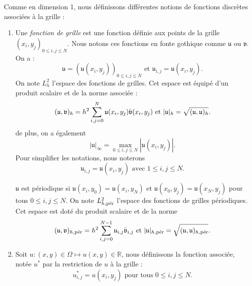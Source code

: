 Comme en dimension 1, nous définissons différentes notions de fonctions discrètes associées à la grille :
\begin{enumerate}
\item Une \textit{fonction de grille} est une fonction définie aux points de la grille $(x_i,y_j)_{0 \leq i,j \leq N}$. Nous notons ces fonctions en fonte gothique comme $\mathfrak{u}$ ou $\mathfrak{v}$. On a :
\begin{equation}
\mathfrak{u} = \left( \mathfrak{u}(x_i,y_j) \right)_{0 \leq i,j \leq N} \text{ et } \mathfrak{u}_{i,j} = \mathfrak{u}(x_i,y_j).
\end{equation}
On note $L^2_h$ l'espace des fonctions de grilles. Cet espace est équipé d'un produit scalaire et de la norme associée :
\begin{equation}
(\mathfrak{u}, \mathfrak{v})_h = h^2 \gsum_{i,j=0}^N \mathfrak{u}(x_i, y_j) \bar{\mathfrak{v}}(x_i, y_j) \text{ et } |\mathfrak{u}|_h = \sqrt{(\mathfrak{u},\mathfrak{u})_h}.
\end{equation}
de plus, on a également
\begin{equation}
| \mathfrak{u} |_{\infty} = \max_{0 \leq i,j \leq N} |\mathfrak{u}(x_i, y_j)|.
\end{equation}
Pour simplifier les notations, nous noterons
\begin{equation}
\mathfrak{u}_{i,j} = \mathfrak{u}(x_i, y_j) \text{ avec } 1 \leq i,j \leq N.
\end{equation}

$\mathfrak{u}$ est périodique si $\mathfrak{u}(x_{i},y_0) = \mathfrak{u}(x_{i},y_N)$ et $\mathfrak{u}(x_{0},y_j) = \mathfrak{u}(x_{N},y_j)$ pour tous $0 \leq i,j \leq N$. On note $L_{h,\per}^2$ l'espace des fonctions de grilles périodiques. Cet espace est doté du produit scalaire et de la norme
\begin{equation}
(\mathfrak{u},\mathfrak{v})_{h,\per} = h^2 \sum_{i,j=0}^{N-1} \mathfrak{u}_{i,j} \bar{\mathfrak{v}}_{i,j} \text{ et } |\mathfrak{u}|_{h,\per} = \sqrt{(\mathfrak{u}, \mathfrak{u})_{h,\per}}.
\end{equation}


\item Soit $u : (x,y) \in \Omega \mapsto u(x,y) \in \mathbb{R}$, nous définissons la fonction associée, notée $u^*$ par la restriction de $u$ à la grille :
\begin{equation}
u^*_{i,j} = u(x_i, y_j) \text{ pour tous } 0 \leq i,j \leq N.
\end{equation}


\end{enumerate}
